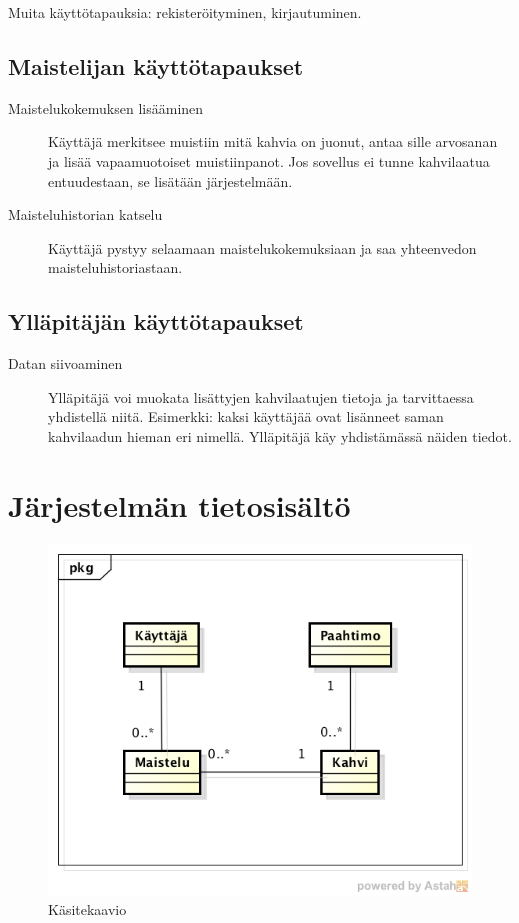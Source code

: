\documentclass[a4paper,titlepage]{article}
\begin{document}
Muita käyttötapauksia: rekisteröityminen, kirjautuminen.

\subsection{Maistelijan käyttötapaukset}

\begin{description}
\item[Maistelukokemuksen lisääminen] Käyttäjä merkitsee muistiin mitä
  kahvia on juonut, antaa sille arvosanan ja lisää vapaamuotoiset
  muistiinpanot. Jos sovellus ei tunne kahvilaatua entuudestaan, se
  lisätään järjestelmään.

\item[Maisteluhistorian katselu] Käyttäjä pystyy selaamaan
  maistelukokemuksiaan ja saa yhteenvedon maisteluhistoriastaan.
\end{description}

\subsection{Ylläpitäjän käyttötapaukset}

\begin{description}
\item[Datan siivoaminen] Ylläpitäjä voi muokata lisättyjen
  kahvilaatujen tietoja ja tarvittaessa yhdistellä niitä. Esimerkki:
  kaksi käyttäjää ovat lisänneet saman kahvilaadun hieman eri
  nimellä. Ylläpitäjä käy yhdistämässä näiden tiedot.
\end{description}

\section{Järjestelmän tietosisältö}

\begin{figure}[ht]
  \caption{Käsitekaavio}
  \label{fig:käsitekaavio}
  \includegraphics[width=12cm]{database}
\end{figure}
\end{document}
